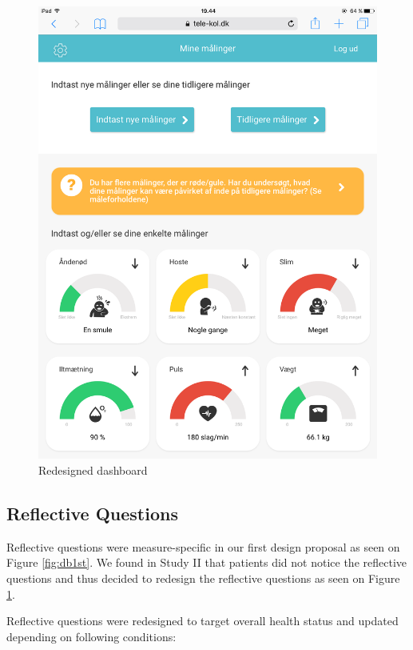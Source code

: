 \begin{figure}[h]
  \begin{minipage}[b]{0.45\textwidth}
    \includegraphics[width=\textwidth]{images/implementation/db.PNG}
    \caption{Redesigned dashboard}
    \label{fig:db2nd}
  \end{minipage}
\end{figure}

\subsection*{Reflective Questions}
Reflective questions were measure-specific in our first design proposal as seen on Figure \ref{fig:db1st}. We found in Study II that patients did not notice the reflective questions and thus decided to redesign the reflective questions as seen on Figure \ref{fig:db2nd}. 

Reflective questions were redesigned to target overall health status and updated depending on following conditions: 
 
